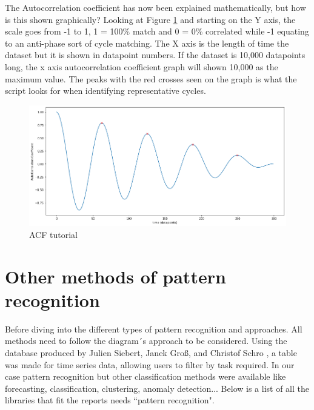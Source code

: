 The Autocorrelation coefficient has now been explained mathematically, but how is this shown graphically? 
Looking at Figure \ref{ACF coefficient} and starting on the Y axis, the scale goes from -1 to 1, 1 = 100\% match and 0 = 0\% correlated while -1 equating to an anti-phase sort of cycle matching.
The X axis is the length of time the dataset but it is shown in datapoint numbers. If the dataset is 10,000 datapoints long, the x axis autocorrelation coefficient graph will shown 10,000 as the maximum value. The peaks with the red crosses seen on the graph is what the script looks for when identifying representative cycles. 
\begin{figure}[h]
\centering
\includegraphics[scale=0.45]{images/ACF u DIAGRAM.png}
\caption{ACF tutorial}
\label{ACF coefficient}
\end{figure}

\section{Other methods of pattern recognition}
Before diving into the different types of pattern recognition and approaches. All methods need to follow the diagram´s approach to be considered. Using the database produced by Julien Siebert, Janek Groß, and Christof Schro  \cite{DBLP:journals/corr/abs-2104-07406}, a table was made for time series data, allowing users to filter by task required. In our case pattern recognition but other classification methods were available like forecasting, classification,	clustering,	anomaly detection... Below is a list of all the libraries that fit the reports needs ``pattern recognition".



